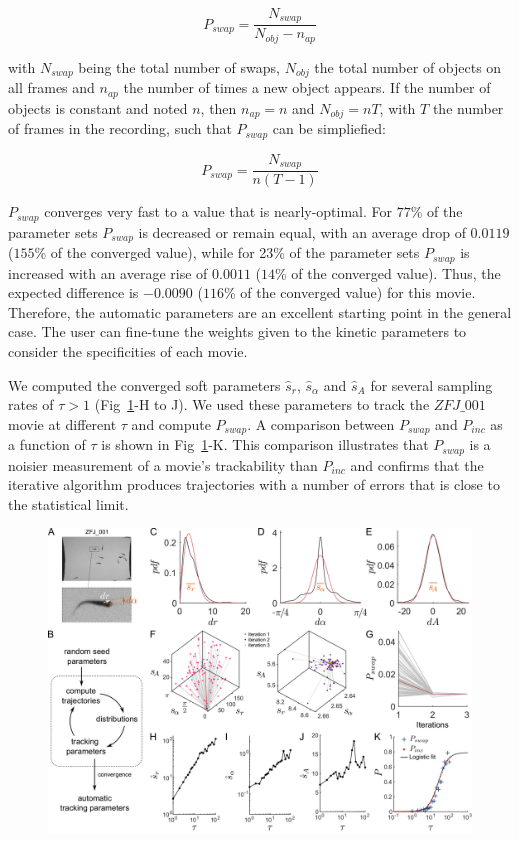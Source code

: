     \begin{equation}
    P_{swap} = \frac{N_{swap}}{N_{obj} - n_{ap}}
    \label{eq:Pswap}
    \end{equation}

    with $N_{swap}$ being the total number of swaps, $N_{obj}$ the total number of objects on all frames and $n_{ap}$ the number of times a new object appears. If the number of objects is constant and noted $n$, then $n_{ap} = n$ and $N_{obj} = nT$, with $T$ the number of frames in the recording, such that $P_{swap}$ can be simpliefied:

    \begin{equation}
    P_{swap} = \frac{N_{swap}}{n(T-1)}
    \label{eq:Pswap_constant}
    \end{equation}

    $P_{swap}$ converges very fast to a value that is nearly-optimal. For $77\%$ of the parameter sets $P_{swap}$ is decreased or remain equal, with an average drop of $0.0119$ ($155$\% of the converged value), while for 23\% of the parameter sets $P_{swap}$ is increased with an average rise of $0.0011$ ($14$\% of the converged value). Thus, the expected difference is $-0.0090$ ($116$\% of the converged value) for this movie. Therefore, the automatic parameters are an excellent starting point in the general case. The user can fine-tune the weights given to the kinetic parameters to consider the specificities of each movie.

    We computed the converged soft parameters $\hat{s}_r$, $\hat{s}_\alpha$ and $\hat{s}_A$ for several sampling rates of $\tau>1$ (Fig~\ref{part_1:fig_5}-H to J). We used these parameters to track the $ZFJ\_001$ movie at different $\tau$ and compute $P_{swap}$. A comparison between $P_{swap}$ and $P_{inc}$ as a function of $\tau$ is shown in Fig~\ref{part_1:fig_5}-K. This comparison illustrates that $P_{swap}$ is a noisier measurement of a movie's trackability than $P_{inc}$ and confirms that the iterative algorithm produces trajectories with a number of errors that is close to the statistical limit.

    \begin{figure}[h!]
    \centering
    \includegraphics[width=1\textwidth]{part_1/assets/Figure_5.png}
    \caption{\textbf{}}
    \label{part_1:fig_5}
    \end{figure}


